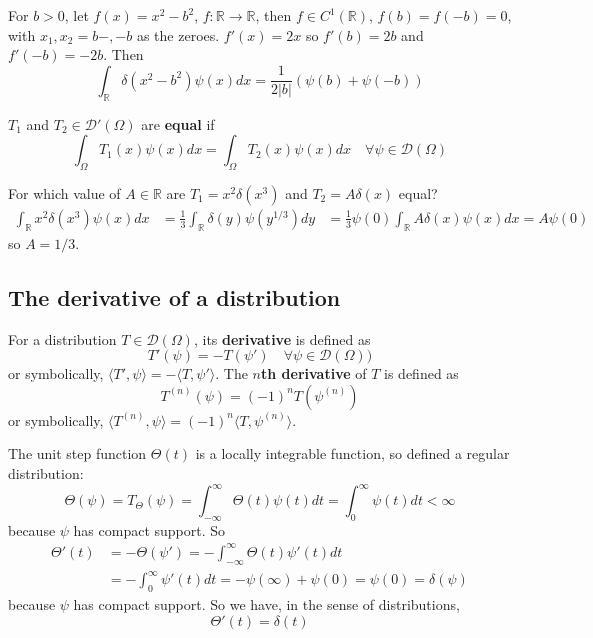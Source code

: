 \begin{example}
	For $b > 0$, let $f(x) = x^2 - b^2$, $f: \mathbb{R} \rightarrow \mathbb{R}$, then $f \in C^1(\mathbb{R})$, $f(b) = f(-b) = 0$, with $x_1, x_2 = b-, -b$ as the zeroes. $f'(x) = 2x$ so $f'(b) = 2b$ and $f'(-b) = -2b$. Then
	\[
		\int_{\mathbb{R}} \delta(x^2 - b^2) \psi(x) dx = \frac{1}{2|b|} (\psi(b) + \psi(-b))
	\]
\end{example}

\begin{definition}
	$T_1$ and $T_2 \in \mathcal{D}'(\Omega)$ are \textbf{equal} if
	\[
		\int_{\Omega} T_1(x) \psi(x) dx = \int_{\Omega} T_2(x) \psi(x) dx \quad \forall \psi \in \mathcal{D}(\Omega)
	\]
\end{definition}

\begin{example}
	For which value of $A \in \mathbb{R}$ are $T_1 = x^2 \delta(x^3)$ and $T_2 = A \delta(x)$ equal?
	\[
		\begin{aligned}
			\int_{\mathbb{R}} x^2 \delta(x^3) \psi(x) dx & = \frac{1}{3} \int_{\mathbb{R}} \delta(y) \psi(y^{1/3}) dy & = \frac{1}{3} \psi(0)
			\int_{\mathbb{R}} A \delta(x) \psi(x) dx = A \psi(0)
		\end{aligned}
	\]
	so $A = 1/3$.
\end{example}

\subsection{The derivative of a distribution}

\begin{definition}
	For a distribution $T \in \mathcal{D}(\Omega)$, its \textbf{derivative} is defined as
	\[
		T'(\psi) = -T(\psi') \quad \forall \psi \in \mathcal{D}(\Omega))
	\]
	or symbolically, $\langle T', \psi \rangle = -\langle T, \psi' \rangle$. The \textbf{$n$th derivative} of $T$ is defined as
	\[
		T^{(n)} (\psi) = {(-1)}^n T(\psi^{(n)})
	\]
	or symbolically, $\langle T^{(n)}, \psi \rangle = {(-1)}^n \langle T, \psi^{(n)} \rangle$.
\end{definition}

\begin{example}
	The unit step function $\Theta(t)$ is a locally integrable function, so defined a regular distribution:
	\[
		\Theta(\psi) = T_{\Theta} (\psi) = \int_{-\infty}^{\infty} \Theta(t) \psi(t) dt = \int_{0}^{\infty} \psi(t) dt < \infty
	\]
	because $\psi$ has compact support. So
	\[
		\begin{aligned}
			\Theta'(t) & = -\Theta(\psi') = -\int_{-\infty}^{\infty} \Theta(t) \psi'(t) dt \\
			& = -\int_{0}^{\infty} \psi'(t) dt = -\psi(\infty) + \psi(0) = \psi(0) = \delta(\psi)
		\end{aligned}
	\]
	because $\psi$ has compact support. So we have, in the sense of distributions,
	\[
		\Theta'(t) = \delta(t)
	\]
\end{example}

